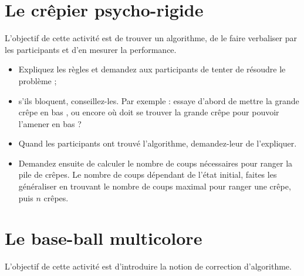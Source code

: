 \documentclass[a5paper,pagesize,DIV=14]{scrbook}
\begin{document}
\section*{Le crêpier psycho-rigide}

L'objectif de cette activité est de trouver un algorithme, de le faire verbaliser par les participants et d'en mesurer la performance.

\begin{itemize}
  \item Expliquez les règles et demandez aux participants de tenter de résoudre le problème ;
  \item s'ils bloquent, conseillez-les. Par exemple : \og essaye d'abord de mettre la grande crêpe en bas \fg, ou encore \og où doit se trouver la grande crêpe pour pouvoir l'amener en bas ? \fg
  \item Quand les participants ont trouvé l'algorithme, demandez-leur de l'expliquer. 
  \item Demandez ensuite de calculer le nombre de coups nécessaires pour ranger la pile de crêpes. Le nombre de coups dépendant de l'état initial, faites les généraliser en trouvant le nombre de coups maximal pour ranger une crêpe, puis $n$ crêpes.
\end{itemize}

\section*{Le base-ball multicolore}

L'objectif de cette activité est d'introduire la notion de correction d'algorithme.
\end{document}
